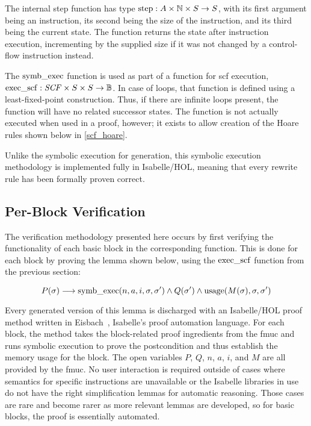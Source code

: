 The internal step function has type $\operatorname{step}:A\times\mathbb{N}\times S\rightarrow S$,%
with its first argument being an instruction, its second being the size of the instruction,
and its third being the current state.
The function returns the state after instruction execution,
incrementing  by the supplied size
if it was not changed by a control-flow instruction instead.

The $\operatorname{symb\_exec}$ function is used as part of a function for \ac{scf} execution,
$\operatorname{exec\_scf}:\mathit{SCF}\times S\times S\rightarrow\mathbb{B}$.
In case of loops, that function is defined using a least-fixed-point construction.
Thus, if there are infinite loops present,
the function will have no related successor states.
The function is not actually executed when used in a proof, however;
it exists to allow creation of the Hoare rules shown below in \cref{scf_hoare}.

Unlike the symbolic execution for generation,
this symbolic execution methodology is implemented fully in Isabelle/HOL,
meaning that every rewrite rule has been formally proven correct.

\subsection{Per-Block Verification}\label{sse:per-block}
The verification methodology presented here occurs
by first verifying the functionality of each basic block in the corresponding function.
This is done for each block by proving the lemma shown below,
using the $\operatorname{exec\_scf}$ function from the previous section:
\begin{lemma}\label{per-block-lemma}
  \begin{equation*}
    P(\sigma)\longrightarrow\operatorname{symb\_exec}(n,a,i,\sigma,\sigma')\wedge
    Q(\sigma')\wedge\operatorname{usage}(M(\sigma),\sigma,\sigma')
  \end{equation*}
\end{lemma}
Every generated version of this lemma is discharged
with an Isabelle/HOL proof method written in Eisbach~\citep{matichuk2016eisbach},
Isabelle's proof automation language.
For each block, the method takes the block-related proof ingredients
from the \ac{fmuc} and runs symbolic execution
to prove the postcondition and thus establish the memory usage for the block.
The open variables $P$, $Q$, $n$, $a$, $i$, and $M$ are all provided by the \ac{fmuc}.
No user interaction is required outside of cases where semantics
for specific instructions are unavailable or the Isabelle libraries in use
do not have the right simplification lemmas for automatic reasoning.
Those cases are rare and become rarer as more relevant lemmas are developed,
so for basic blocks, the proof is essentially automated.

